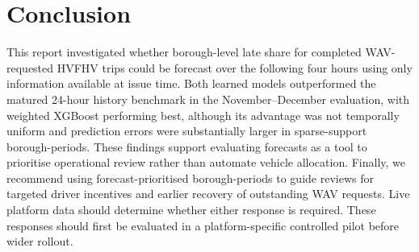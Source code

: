 \documentclass[11pt]{article}
\begin{document}
\section{Conclusion}
This report investigated whether borough-level late share for completed WAV-requested HVFHV
trips could be forecast over the following four hours using only information available at issue
time. Both learned models outperformed the matured 24-hour history benchmark in the November–December
evaluation, with weighted XGBoost performing best, although its advantage was not temporally uniform
and prediction errors were substantially larger in sparse-support borough-periods. These findings
support evaluating forecasts as a tool to prioritise operational review rather than automate vehicle
allocation. Finally, we recommend using forecast-prioritised borough-periods to guide reviews for targeted
driver incentives and earlier recovery of outstanding WAV requests. Live platform data should determine whether
either response is required. These responses should first be evaluated in a platform-specific controlled pilot before
wider rollout.

\clearpage

\printbibliography
\end{document}
